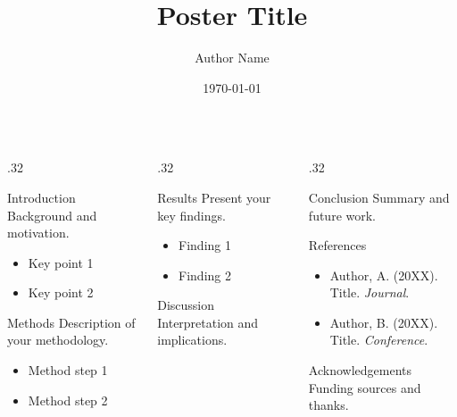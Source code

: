 \documentclass[final]{beamer}
\title{Poster Title}
\author{Author Name}
\institute{University}
\date{\today}
\begin{document}
\begin{frame}
  \begin{columns}[t]

    \begin{column}{.32\textwidth}
      \begin{block}{Introduction}
        Background and motivation.
        \begin{itemize}
          \item Key point 1
          \item Key point 2
        \end{itemize}
      \end{block}

      \begin{block}{Methods}
        Description of your methodology.
        \begin{itemize}
          \item Method step 1
          \item Method step 2
        \end{itemize}
      \end{block}
    \end{column}

    \begin{column}{.32\textwidth}
      \begin{block}{Results}
        Present your key findings.
        \begin{itemize}
          \item Finding 1
          \item Finding 2
        \end{itemize}
      \end{block}

      \begin{block}{Discussion}
        Interpretation and implications.
      \end{block}
    \end{column}

    \begin{column}{.32\textwidth}
      \begin{block}{Conclusion}
        Summary and future work.
      \end{block}

      \begin{block}{References}
        \begin{itemize}
          \item Author, A. (20XX). Title. \textit{Journal}.
          \item Author, B. (20XX). Title. \textit{Conference}.
        \end{itemize}
      \end{block}

      \begin{block}{Acknowledgements}
        Funding sources and thanks.
      \end{block}
    \end{column}

  \end{columns}
\end{frame}
\end{document}
